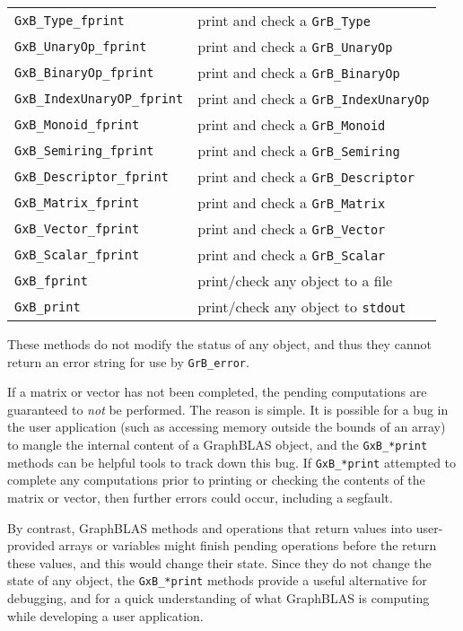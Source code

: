 \documentclass[12pt]{article}
\begin{document}
{\vspace{0.2in}
{\footnotesize
\begin{tabular}{ll}
\hline
\verb'GxB_Type_fprint'         & print and check a \verb'GrB_Type' \\
\verb'GxB_UnaryOp_fprint'      & print and check a \verb'GrB_UnaryOp' \\
\verb'GxB_BinaryOp_fprint'     & print and check a \verb'GrB_BinaryOp' \\
\verb'GxB_IndexUnaryOP_fprint' & print and check a \verb'GrB_IndexUnaryOp' \\
\verb'GxB_Monoid_fprint'       & print and check a \verb'GrB_Monoid' \\
\verb'GxB_Semiring_fprint'     & print and check a \verb'GrB_Semiring' \\
\verb'GxB_Descriptor_fprint'   & print and check a \verb'GrB_Descriptor' \\
\verb'GxB_Matrix_fprint'       & print and check a \verb'GrB_Matrix' \\
\verb'GxB_Vector_fprint'       & print and check a \verb'GrB_Vector' \\
\verb'GxB_Scalar_fprint'       & print and check a \verb'GrB_Scalar' \\
\hline
\verb'GxB_fprint'             & print/check any object to a file \\
\verb'GxB_print'              & print/check any object to \verb'stdout' \\
\hline
\end{tabular}
}
\vspace{0.2in}

These methods do not modify the status of any object, and thus they
cannot return an error string for use by \verb'GrB_error'.

If a matrix or vector
has not been completed, the pending computations are guaranteed to {\em not} be
performed. The reason is simple.  It is possible for a bug in the user
application (such as accessing memory outside the bounds of an array) to mangle
the internal content of a GraphBLAS object, and the \verb'GxB_*print' methods
can be helpful tools to track down this bug.  If \verb'GxB_*print' attempted to
complete any computations prior to printing or checking the contents of the
matrix or vector, then further errors could occur, including a segfault.

By contrast, GraphBLAS methods and operations that return values into
user-provided arrays or variables might finish pending operations before the
return these values, and this would change their state.  Since they do not
change the state of any object, the \verb'GxB_*print' methods provide a useful
alternative for debugging, and for a quick understanding of what GraphBLAS is
computing while developing a user application.

}
\end{document}
